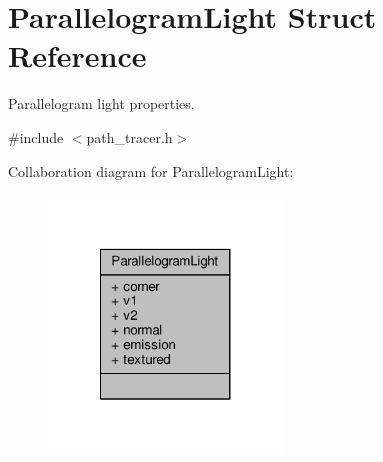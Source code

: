 \hypertarget{struct_parallelogram_light}{\section{Parallelogram\-Light Struct Reference}
\label{struct_parallelogram_light}
}


Parallelogram light properties.  




{\ttfamily \#include $<$path\-\_\-tracer.\-h$>$}



Collaboration diagram for Parallelogram\-Light\-:
\nopagebreak
\begin{figure}[H]
\begin{center}
\leavevmode
\includegraphics[width=176pt]{struct_parallelogram_light__coll__graph}
\end{center}
\end{figure}
